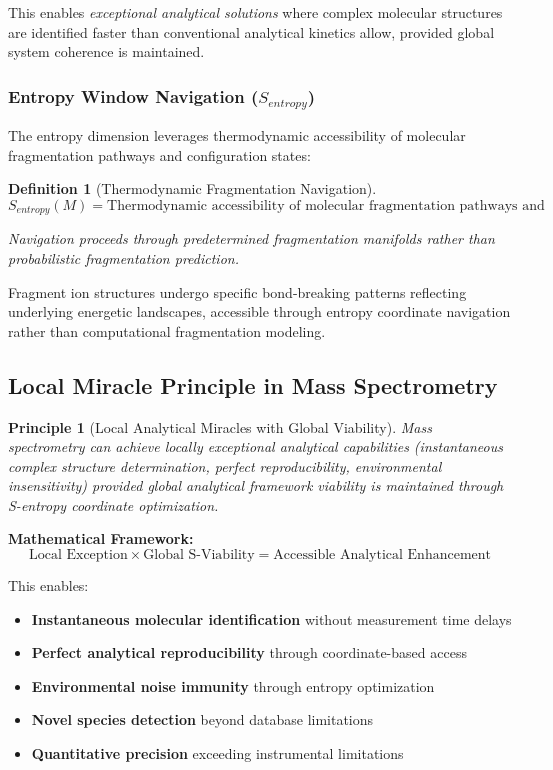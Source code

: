 \documentclass[11pt,a4paper]{article}
\newtheorem{definition}[theorem]{Definition}
\newtheorem{principle}[theorem]{Principle}
\theoremstyle{remark}
\begin{document}
This enables \emph{exceptional analytical solutions} where complex molecular structures are identified faster than conventional analytical kinetics allow, provided global system coherence is maintained.

\subsubsection{Entropy Window Navigation ($S_{entropy}$)}

The entropy dimension leverages thermodynamic accessibility of molecular fragmentation pathways and configuration states:

\begin{definition}[Thermodynamic Fragmentation Navigation]
$$S_{entropy}(M) = \text{Thermodynamic accessibility of molecular fragmentation pathways and configuration endpoints}$$

Navigation proceeds through predetermined fragmentation manifolds rather than probabilistic fragmentation prediction.
\end{definition}

Fragment ion structures undergo specific bond-breaking patterns reflecting underlying energetic landscapes, accessible through entropy coordinate navigation rather than computational fragmentation modeling.

\subsection{Local Miracle Principle in Mass Spectrometry}

\begin{principle}[Local Analytical Miracles with Global Viability]
Mass spectrometry can achieve locally exceptional analytical capabilities (instantaneous complex structure determination, perfect reproducibility, environmental insensitivity) provided global analytical framework viability is maintained through S-entropy coordinate optimization.
\end{principle}

\textbf{Mathematical Framework:}
$$\text{Local Exception} \times \text{Global S-Viability} = \text{Accessible Analytical Enhancement}$$

This enables:
\begin{itemize}
\item \textbf{Instantaneous molecular identification} without measurement time delays
\item \textbf{Perfect analytical reproducibility} through coordinate-based access
\item \textbf{Environmental noise immunity} through entropy optimization
\item \textbf{Novel species detection} beyond database limitations
\item \textbf{Quantitative precision} exceeding instrumental limitations
\end{itemize}
\end{document}
